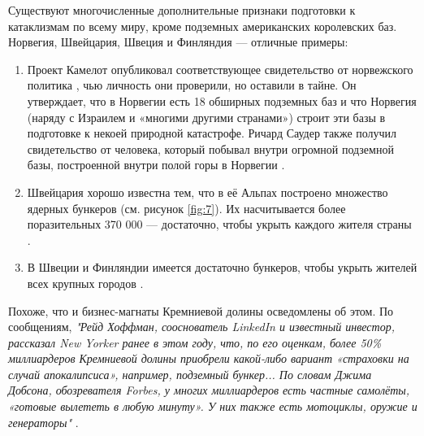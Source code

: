 \documentclass[10pt,twocolumn,letterpaper]{article}
\begin{document}
Существуют многочисленные дополнительные признаки подготовки к катаклизмам по всему миру, кроме подземных американских королевских баз. Норвегия, Швейцария, Швеция и Финляндия — отличные примеры:

\begin{flushleft}
\begin{enumerate}
    \item Проект Камелот опубликовал соответствующее свидетельство от норвежского политика \cite{25,26}, чью личность они проверили, но оставили в тайне. Он утверждает, что в Норвегии есть 18 обширных подземных баз и что Норвегия (наряду с Израилем и «многими другими странами») строит эти базы в подготовке к некоей природной катастрофе. Ричард Саудер также получил свидетельство от человека, который побывал внутри огромной подземной базы, построенной внутри полой горы в Норвегии \cite{22}.
    \item Швейцария хорошо известна тем, что в её Альпах построено множество ядерных бункеров (см. рисунок \ref{fig:7}). Их насчитывается более поразительных 370 000 — достаточно, чтобы укрыть каждого жителя страны \cite{27}.
    \item В Швеции и Финляндии имеется достаточно бункеров, чтобы укрыть жителей всех крупных городов \cite{27}.
\end{enumerate}
\end{flushleft}

Похоже, что и бизнес-магнаты Кремниевой долины осведомлены об этом. По сообщениям, \textit{"Рейд Хоффман, сооснователь LinkedIn и известный инвестор, рассказал New Yorker ранее в этом году, что, по его оценкам, более 50\% миллиардеров Кремниевой долины приобрели какой-либо вариант «страховки на случай апокалипсиса», например, подземный бункер... По словам Джима Добсона, обозревателя Forbes, у многих миллиардеров есть частные самолёты, «готовые вылететь в любую минуту». У них также есть мотоциклы, оружие и генераторы"} \cite{28}.
\end{document}
